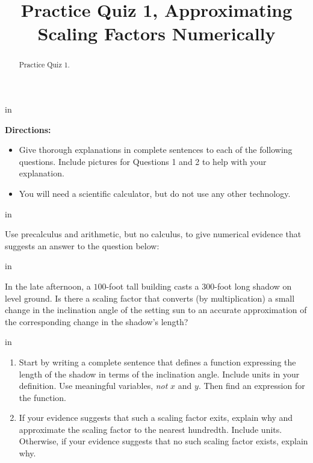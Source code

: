 \documentclass{ximera}
\title{Practice Quiz 1, Approximating Scaling Factors Numerically}
\newcommand{\pskip}{\vskip 0.1 in}
\begin{document}
\begin{abstract}
Practice Quiz 1.
\end{abstract}
\maketitle


\pskip

{\bf Directions:}

\begin{itemize}
\item Give thorough explanations in complete sentences to each of the following questions. Include pictures for Questions 1 and 2 to help with your explanation. 

\item You will need a scientific calculator, but do not use any other technology.

\end{itemize}


\pskip

\begin{question} \label{QKdf3rt3cg}
Use precalculus and arithmetic, but no calculus, to give numerical evidence that suggests an answer to the question below:

\pskip

In the late afternoon, a $100$-foot tall building casts a $300$-foot long shadow on level ground. Is there a scaling factor that converts (by multiplication) a small change in the inclination angle of the setting sun to an accurate approximation of the corresponding change in the shadow's length? 

\pskip

\begin{enumerate}

\item Start by writing a complete sentence that defines a function expressing the length of the shadow in terms of the inclination angle. Include units in your definition. Use meaningful variables, \emph{not} $x$ and $y$. Then find an expression for the function.


\item If your evidence suggests that such a scaling factor exits, explain why and approximate the scaling factor to the nearest hundredth. Include units. Otherwise, if your evidence suggests that no such scaling factor exists, explain why.

\end{enumerate}
\end{question}
\end{document}
